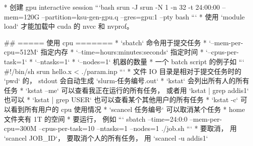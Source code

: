 
* 创建 gpu interactive session
```bash
srun -J srun -N 1 -n 32 -t 24:00:00 --mem=120G --partition=ksu-gen-gpu.q --gres=gpu:1 --pty bash
```
* 使用 `module load` 才能加载中 cuda 的 nvcc 和 nvprof。

## ===== 使用 cpu =======
* `sbatch` 命令用于提交任务
* `--mem-per-cpu=512M` 指定内存
* `--time=hours:minutes:seconds` 指定时间
* `--cpus-per-task=1`
* `--ntasks=1`
* `--nodes=1` 机器的数量
* 一个 batch script 的例子如
```
#!/bin/sh
srun hello.x < ./param.inp
```
* 文件 IO 目录是相对于提交任务时的 `pwd` 的， stdout 会自动生成 `slurm-任务编号.out`
* `kstat` 会列出所有人的所有任务
* `kstat --me` 可以查看我正在运行的所有任务， 或者用 `kstat | grep addis1` 也可以
* `kstat | grep USER` 也可以查看某个其他用户的所有任务
* `kstat -c` 可以看到所有用户的 cpu 使用情况
* `scancel 任务编号` 可以取消某个任务
* home 文件夹有 1T 的空间
* 要运行， 例如
```
sbatch --time=24:0:0 --mem-per-cpu=300M --cpus-per-task=10 --ntasks=1 --nodes=1 ./job.sh
```
* 要取消， 用 `scancel JOB_ID`， 要取消个人的所有任务， 用 `scancel -u addis1`
